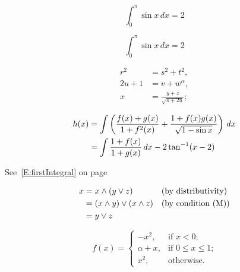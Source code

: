 \documentclass[leqno]{sample}
\numberwithin{equation}{section}
\begin{document}
\begin{equation}
    \label{E:firstIntegral}
    \int_0^{\pi} \sin x\,dx = 2
\end{equation}

\begin{equation}
    \tag{Int}
    \int_0^{\pi} \sin x\, dx = 2
\end{equation}

\begin{align}
    r^2 &= s^2 + t^2, \label{E:Pyth}\\
    2u + 1 &= v + w^{\alpha}, \label{E:alpha}\\
    x &= \frac{y+z}{\sqrt{s+2u}}; \label{E:frac}
\end{align}

\begin{align}
    h(x) &= \int \left(
                    \frac{f(x) + g(x)}{1+f^2(x)} +
                    \frac{1 + f(x)g(x)}{\sqrt{1 - \sin x}}
                        \right)\,dx\\
    &= \int \frac{1 + f(x)}{1 + g(x)}\,dx - 2 \tan^{-1}(x-2) \notag
\end{align}

\clearpage

See~\eqref{E:firstIntegral} on page~\pageref{E:firstIntegral}

\begin{align}
    x &= x \wedge (y \vee z) && \text{(by distributivity)}\\
    &= (x \wedge y) \vee (x \wedge z) && \text{(by condition (M))} \notag\\
    &= y \vee z \notag
\end{align}

\[
    f(x) =
    \begin{cases}
        -x^2,       &\text{if $x < 0$;}\\
        \alpha + x, &\text{if $0 \leq x \leq 1$;}\\
        x^2,        &\text{otherwise.}
    \end{cases}
\]
\end{document}
